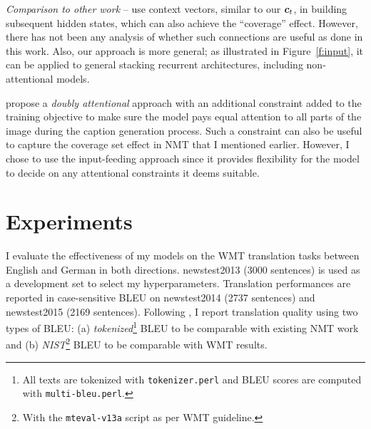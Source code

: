 {\it Comparison to other work} -- 
use context vectors, similar to
our $\mbox{\boldmath{$c$}}_{t}$, in building subsequent hidden states, which can also 
achieve the ``coverage'' effect. However, there has not been any analysis of 
whether such connections are useful as done in this work. Also,
our approach is more general; as illustrated in Figure~\ref{f:input}, it can be
applied to general stacking recurrent architectures, including non-attentional
models.

 propose a {\it doubly attentional} approach with an
additional constraint added to the training objective to make sure the model
pays equal attention to all parts of the image during the caption generation process. Such a constraint can also be useful to capture the coverage set effect in NMT that I mentioned earlier. However, I chose to use the input-feeding approach since it provides flexibility for the model to decide on any attentional constraints it deems suitable.

\section{Experiments}
\label{sec:exp}
I evaluate the effectiveness of my models on the WMT translation tasks between
English and German in both directions. newstest2013 (3000 sentences) is used as
a development set to select my hyperparameters. Translation performances are
reported in case-sensitive BLEU \cite{Papineni02bleu} on newstest2014 (2737 sentences) and
newstest2015 (2169 sentences). Following \cite{luong15}, I report
translation quality using two types of BLEU: (a) {\it
tokenized}\footnote{All texts are tokenized with \texttt{tokenizer.perl} and BLEU
scores are computed with \texttt{multi-bleu.perl}.} BLEU to be comparable with
existing NMT work and (b) {\it NIST}\footnote{With the \texttt{mteval-v13a}
script as per WMT guideline.} BLEU to be comparable
with WMT results.

